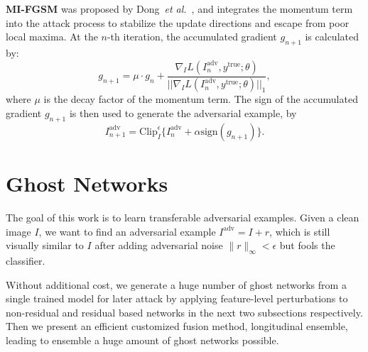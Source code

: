 \documentclass[letterpaper]{article} %
\def\etal{\emph{et al.}}
\begin{document}
\vspace{1ex}\noindent\textbf{MI-FGSM} was proposed by Dong~\etal~\cite{dong2017boosting}, and integrates the momentum term into the attack process to stabilize the update directions and escape from poor local maxima. At the $n$-th iteration, the accumulated gradient $g_{n+1}$ is calculated by:
\begin{equation} \label{eq: momentum term}
g_{n+1} = \mu \cdot g_n + \frac{\nabla_{I} L(I_{n}^{\text{adv}}, y^{\text{true}}; \theta)}{||\nabla_{I} L(I_{n}^{\text{adv}}, y^{\text{true}}; \theta)||_1},
\end{equation}
where $\mu$ is the decay factor of the momentum term. The sign of the accumulated gradient $g_{n+1}$ is then used to generate the adversarial example, by
\begin{equation}
I_{n+1}^{\text{adv}} = \text{Clip}_{I}^{\epsilon}\{I_{n}^{\text{adv}} + \alpha\text{sign}(g_{n+1})\}.
\end{equation}

\section{Ghost Networks} \label{sec:method}
The goal of this work is to learn transferable adversarial examples. Given a clean image $I$, we want to find an adversarial example $I^\text{adv}=I+r$, which is still visually similar to $I$ after adding adversarial noise $\|r\|_\infty<\epsilon$ but fools the classifier. %

Without additional cost, we generate a huge number of ghost networks from a single trained model for later attack by applying feature-level perturbations to non-residual and residual based networks in the next two subsections respectively.
Then we present an efficient customized fusion method, longitudinal ensemble, leading to ensemble a huge amount of ghost networks possible.
\end{document}
